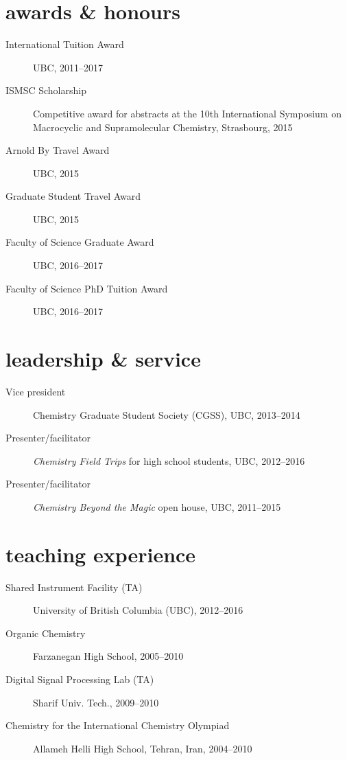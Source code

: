 \documentclass[overlapped,line,10pt,letterpaper]{res}
\begin{document}
\begin{resume}
\section{awards \& honours}
\begin{description}
\item[International Tuition Award] UBC, 2011–2017
\item[ISMSC Scholarship] Competitive award for abstracts at the 10th International Symposium on Macrocyclic and Supramolecular Chemistry, Strasbourg, 2015
\item[Arnold By Travel Award] UBC, 2015
\item[Graduate Student Travel Award] UBC, 2015
\item[Faculty of Science Graduate Award] UBC, 2016–2017
\item[Faculty of Science PhD Tuition Award] UBC, 2016–2017
\end{description}

\section{leadership \& service}
\begin{description}
\item[Vice president] Chemistry Graduate Student Society (CGSS), UBC, 2013–2014
\item[Presenter/facilitator] \emph{Chemistry Field Trips} for high school students, UBC, 2012–2016
\item[Presenter/facilitator] \emph{Chemistry Beyond the Magic} open house, UBC, 2011–2015
\end{description}

\section{teaching experience}
\begin{description}
\item[Shared Instrument Facility (TA)] University of British Columbia (UBC), 2012–2016
\item[Organic Chemistry] Farzanegan High School, 2005–2010
\item[Digital Signal Processing Lab (TA)] Sharif Univ. Tech., 2009–2010
\item[Chemistry for the International Chemistry Olympiad] Allameh Helli High School, Tehran, Iran, 2004–2010
\end{description}


\end{resume}
\end{document}
